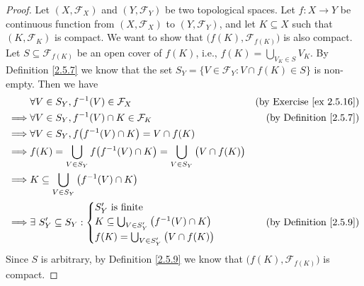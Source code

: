 \begin{proof}
    Let \((X, \mathcal{F}_X)\) and \((Y, \mathcal{F}_Y)\) be two topological spaces.
    Let \(f : X \to Y\) be continuous function from \((X, \mathcal{F}_X)\) to \((Y, \mathcal{F}_Y)\), and let \(K \subseteq X\) such that \((K, \mathcal{F}_K)\) is compact.
    We want to show that \(\big(f(K), \mathcal{F}_{f(K)}\big)\) is also compact.
    Let \(S \subseteq \mathcal{F}_{f(K)}\) be an open cover of \(f(K)\), i.e., \(f(K) = \bigcup_{V_K \in S} V_K\).
    By Definition \ref{2.5.7} we know that the set \(S_Y = \{V \in \mathcal{F}_Y : V \cap f(K) \in S\}\) is non-empty.
    Then we have
    \begin{align*}
                 & \forall V \in S_Y, f^{-1}(V) \in \mathcal{F}_X                                                     & \text{(by Exercise \ref{ex 2.5.16})} \\
        \implies & \forall V \in S_Y, f^{-1}(V) \cap K \in \mathcal{F}_K                                              & \text{(by Definition \ref{2.5.7})}   \\
        \implies & \forall V \in S_Y, f\big(f^{-1}(V) \cap K\big) = V \cap f(K)                                                                              \\
        \implies & f(K) = \bigcup_{V \in S_Y} f\big(f^{-1}(V) \cap K\big) = \bigcup_{V \in S_Y} \big(V \cap f(K)\big)                                        \\
        \implies & K \subseteq \bigcup_{V \in S_Y} \big(f^{-1}(V) \cap K\big)                                                                                \\
        \implies & \exists\ S_Y' \subseteq S_Y : \begin{cases}
                                                     S_Y' \text{ is finite}                                      \\
                                                     K \subseteq \bigcup_{V \in S_Y'} \big(f^{-1}(V) \cap K\big) \\
                                                     f(K) = \bigcup_{V \in S_Y'} \big(V \cap f(K)\big)
                                                 \end{cases}                                     & \text{(by Definition \ref{2.5.9})}                        \\
    \end{align*}
    Since \(S\) is arbitrary, by Definition \ref{2.5.9} we know that \(\big(f(K), \mathcal{F}_{f(K)}\big)\) is compact.


\end{proof}
